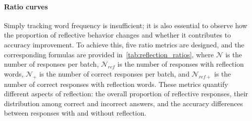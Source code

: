 \documentclass{article} %
\begin{document}
\paragraph{Ratio curves}
%
%
\begin{table}
\centering
{}
%
\caption{Definition of Ratio ratios.}
\label{tab:reflection_ratios}
\end{table}
%
Simply tracking word frequency is insufficient; it is also essential to observe how the proportion of reflective behavior changes and whether it contributes to accuracy improvement. To achieve this, five ratio metrics are designed, and the corresponding formulas are provided in~\cref{tab:reflection_ratios}, where $\mathcal{N}$ is the number of responses per batch, $\mathcal{N}_{ref}$ is the number of responses with reflection words, $\mathcal{N}_{+}$ is the number of correct responses per batch, and $\mathcal{N}_{ref+}$ is the number of correct responses with reflection words. These metrics quantify different aspects of reflection: the overall proportion of reflective responses, their distribution among correct and incorrect answers, and the accuracy differences between responses with and without reflection.
\end{document}
